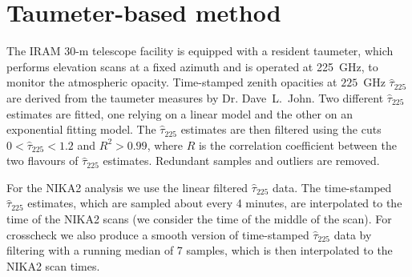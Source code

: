 \section{Taumeter-based method}%
\label{se:taumeter-method}

The IRAM 30-m telescope facility is equipped with a resident taumeter, which performs
elevation scans at a fixed azimuth and is operated at 225~GHz, to
monitor the atmospheric opacity.
Time-stamped zenith opacities at $225$~GHz $\hat{\tau}_{225}$ are derived from the
taumeter measures by Dr. Dave~L.~John. Two different $\hat{\tau}_{225}$
estimates are fitted, one relying on a linear model and the other on
an exponential fitting model. The $\hat{\tau}_{225}$ estimates are then
filtered using the cuts $0< \hat{\tau}_{225} <1.2$ and $R^2 > 0.99$, where
$R$ is the correlation coefficient between the two flavours of
$\hat{\tau}_{225}$ estimates. Redundant samples and outliers are removed.

For the NIKA2 analysis we use the linear filtered  $\hat{\tau}_{225}$ data.
The time-stamped $\hat{\tau}_{225}$ estimates, which are sampled about
every 4 minutes, are interpolated to the time of the NIKA2 scans (we
consider the time of the middle of the scan). For crosscheck we also
produce a smooth version of time-stamped $\hat{\tau}_{225}$ data by
filtering with a running median of 7 samples, which is then
interpolated to the NIKA2 scan times.


